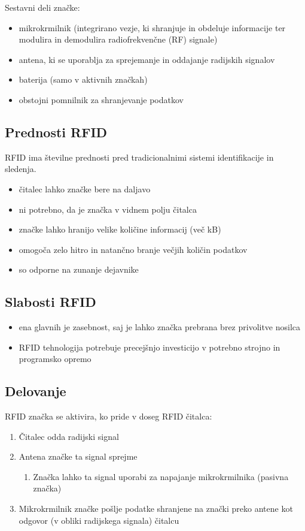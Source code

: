 \documentclass[]{article}
\begin{document}
\noindent
Sestavni deli zna\v{c}ke:
\begin{itemize}
  \item mikrokrmilnik (integrirano vezje, ki shranjuje in obdeluje
    informacije ter modulira in demodulira radiofrekven\v{c}ne (RF)
    signale)
  \item antena, ki se uporablja za sprejemanje in oddajanje radijskih
    signalov
  \item baterija (samo v aktivnih zna\v{c}kah)
  \item obstojni pomnilnik za shranjevanje podatkov
\end{itemize}

\subsection{Prednosti RFID}
RFID ima \v{s}tevilne prednosti pred tradicionalnimi sistemi
identifikacije in sledenja.
\begin{itemize}
  \item \v{c}italec lahko zna\v{c}ke bere na daljavo
  \item ni potrebno, da je zna\v{c}ka v vidnem polju \v{c}italca
  \item zna\v{c}ke lahko hranijo velike koli\v{c}ine informacij
    (ve\v{c} kB)
  \item omogo\v{c}a zelo hitro in natan\v{c}no branje ve\v{c}jih
    koli\v{c}in podatkov
  \item so odporne na zunanje dejavnike 
\end{itemize}

\subsection{Slabosti RFID}
\begin{itemize}
  \item ena glavnih je zasebnost, saj je lahko zna\v{c}ka prebrana
    brez privolitve nosilca
  \item RFID tehnologija potrebuje precej\v{s}njo investicijo v
    potrebno strojno in programsko opremo
\end{itemize}

\clearpage
\subsection{Delovanje}
RFID zna\v{c}ka se aktivira, ko pride v doseg RFID \v{c}italca:
\begin{enumerate}
  \item Čitalec odda radijski signal
  \item Antena značke ta signal sprejme
    \begin{enumerate}[label=\alph*.]
      \item Značka lahko ta signal uporabi za napajanje mikrokrmilnika (pasivna značka)
    \end{enumerate}
  \item Mikrokrmilnik značke pošlje podatke shranjene na znački preko antene kot odgovor (v obliki radijskega signala) čitalcu
\end{enumerate}
\end{document}
